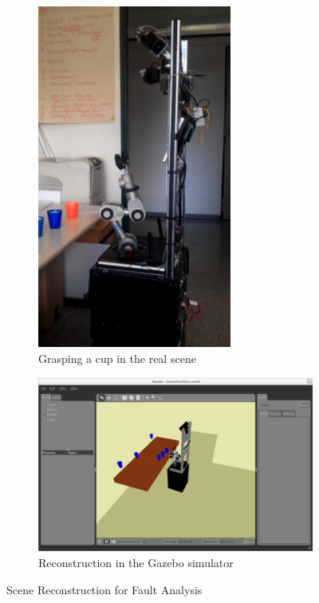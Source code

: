 \begin{figure}
  \centering
  \begin{subfigure}[b]{0.38\textwidth}
    \includegraphics[width=0.7\textwidth]{pics/klingen_real}
    \caption{Grasping a cup in the real scene}
    \label{fig:klingen_real}
  \end{subfigure}
  \begin{subfigure}[b]{0.58\textwidth}
    \includegraphics[width=\textwidth]{pics/klingen_sim}
    \caption{Reconstruction in the Gazebo simulator}
    \label{fig:klingen_sim}
  \end{subfigure}
  \caption{Scene Reconstruction for Fault Analysis~\cite{KlingenDA}}
  \label{fig:klingen}
\end{figure}
